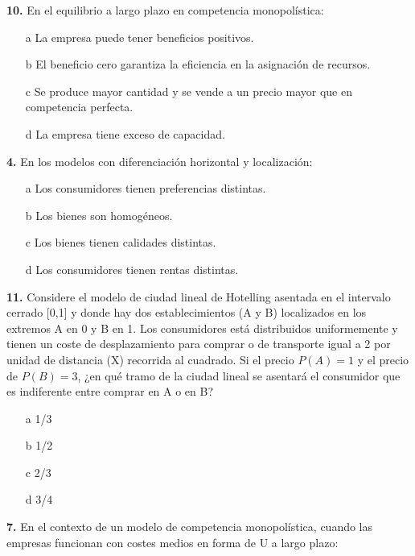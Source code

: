 \documentclass{nuevotema}
\begin{document}

\textbf{10.} En el equilibrio a largo plazo en competencia monopolística:

\begin{itemize}
	\item[a] La empresa puede tener beneficios positivos.
	\item[b] El beneficio cero garantiza la eficiencia en la asignación de recursos.
	\item[c] Se produce mayor cantidad y se vende a un precio mayor que en competencia perfecta.
	\item[d] La empresa tiene exceso de capacidad.
\end{itemize}


\textbf{4.} En los modelos con diferenciación horizontal y localización: 

\begin{itemize}
	\item[a] Los consumidores tienen preferencias distintas.
	\item[b] Los bienes son homogéneos.
	\item[c] Los bienes tienen calidades distintas.
	\item[d] Los consumidores tienen rentas distintas.
\end{itemize}

\textbf{11.} Considere el modelo de ciudad lineal de Hotelling asentada en el intervalo cerrado [0,1] y donde hay dos establecimientos (A y B) localizados en los extremos A en 0 y B en 1. Los consumidores está distribuidos uniformemente y tienen un coste de desplazamiento para comprar o de transporte igual a 2 por unidad de distancia (X) recorrida al cuadrado.
Si el precio $P(A)=1$ y el precio de $P(B)=3$, ¿en qué tramo de la ciudad lineal se asentará el consumidor que es indiferente entre comprar en A o en B?

\begin{enumerate}
	\item[a] 1/3
	\item[b] 1/2
	\item[c] 2/3
	\item[d] 3/4
\end{enumerate}


\textbf{7.} En el contexto de un modelo de competencia monopolística, cuando las empresas funcionan con costes medios en forma de U a largo plazo:
\end{document}
